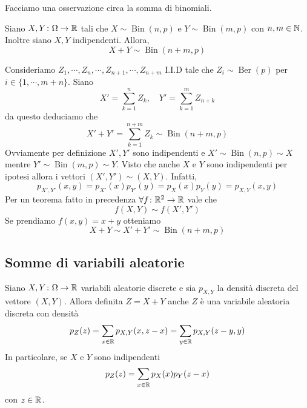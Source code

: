 \documentclass[a4paper]{article}
\begin{document}
Facciamo una osservazione circa la somma di binomiali.

\begin{snippetproposition}{}
    Siano \(X,Y \colon \Omega \to \mathbb{R}\) tali che
    \(X \sim \operatorname{Bin}(n,p)\) e \(Y \sim \operatorname{Bin}(m,p)\)
    con \(n,m \in \mathbb{N}\).
    Inoltre siano \(X,Y\) indipendenti.
    Allora, \[
        X + Y \sim \operatorname{Bin}(n+m, p)
    \]
\end{snippetproposition}

\begin{snippetproof}{}
    Consideriamo \(Z_1, \cdots, Z_n, \cdots, Z_{n+1}, \cdots, Z_{n+m}\) I.I.D tale che
    \(Z_i \sim \operatorname{Ber}(p)\) per \(i \in \{1, \cdots, m+n\}\).
    Siano \[
        X' = \sum_{k=1}^n Z_k, \quad Y' = \sum_{k=1}^m Z_{n+k}
    \]
    da questo deduciamo che
    \[
        X' + Y' = \sum_{k=1}^{n+m} Z_k \sim \operatorname{Bin}(n+m,p)
    \]
    Ovviamente per definizione \(X', Y'\)
    sono indipendenti e \(X' \sim \operatorname{Bin}(n,p) \sim X\)
    mentre \(Y' \sim \operatorname{Bin}(m,p) \sim Y\).
    Visto che anche \(X\) e \(Y\) sono indipendenti per ipotesi allora i vettori
    \((X', Y') \sim (X,Y)\). Infatti,
    \[
        p_{X',Y'}(x,y) = p_{X'}(x)p_{Y'}(y) = p_X(x)p_Y(y)
        = p_{X,Y}(x,y)
    \]
    Per un teorema fatto in precedenza
    \(\forall f \colon \mathbb{R}^2 \to \mathbb{R}\) vale che
    \[
        f(X,Y) \sim f(X',Y')
    \]
    Se prendiamo \(f(x,y) = x + y\) otteniamo \[
        X+Y \sim X' + Y' \sim \operatorname{Bin}(n+m,p)
    \]
\end{snippetproof}

\pagebreak

\subsection{Somme di variabili aleatorie}

\begin{snippetproposition}{}
    Siano \(X,Y \colon \Omega \to \mathbb{R}\)
    variabili aleatorie discrete e sia \(p_{X,Y}\) la densità discreta del vettore
    \((X,Y)\). Allora definita \(Z = X+Y\) anche \(Z\)
    è una variabile aleatoria discreta con densità
    \[
        p_Z(z) = \sum_{x\in\mathbb{R}}
        p_{X,Y}(x, z-x) = \sum_{y \in \mathbb{R}}
        p_{X,Y}(z-y,y)
    \]
    In particolare, se \(X\) e \(Y\) sono indipendenti
    \[
        p_Z(z) = \sum_{x \in \mathbb{R}}
        p_X(x)p_Y(z-x)
    \]
    con \(z \in \mathbb{R}\).
\end{snippetproposition}
\end{document}
